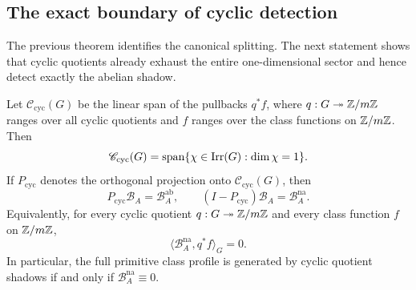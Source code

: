 \subsection{The exact boundary of cyclic detection}

The previous theorem identifies the canonical splitting. The next
statement shows that cyclic quotients already exhaust the entire
one-dimensional sector and hence detect exactly the abelian shadow.

\begin{theorem}
  \label{thm:cyclic-detection-boundary}
  Let \(\mathscr C_{\mathrm{cyc}}(G)\) be the linear span of the
  pullbacks \(q^\ast f\), where \(q:G\twoheadrightarrow \mathbb{Z}/m\mathbb{Z}\)
  ranges over all cyclic quotients and \(f\) ranges over the class
  functions on \(\mathbb{Z}/m\mathbb{Z}\). Then
  \[
    \mathscr C_{\mathrm{cyc}}(G)
    =
    \operatorname{span}\{\chi\in\operatorname{Irr}(G):\dim\chi=1\}.
  \]
  If \(P_{\mathrm{cyc}}\) denotes the orthogonal projection onto
  \(\mathscr C_{\mathrm{cyc}}(G)\), then
  \[
    P_{\mathrm{cyc}}\mathcal B_A=\mathcal B_A^{\mathrm{ab}},
    \qquad
    (I-P_{\mathrm{cyc}})\mathcal B_A=\mathcal B_A^{\mathrm{na}}.
  \]
  Equivalently, for every cyclic quotient \(q:G\twoheadrightarrow \mathbb{Z}/m\mathbb{Z}\)
  and every class function \(f\) on \(\mathbb{Z}/m\mathbb{Z}\),
  \[
    \langle \mathcal B_A^{\mathrm{na}},q^\ast f\rangle_G=0.
  \]
  In particular, the full primitive class profile is generated by
  cyclic quotient shadows if and only if
  \(\mathcal B_A^{\mathrm{na}}\equiv 0\).
\end{theorem}

